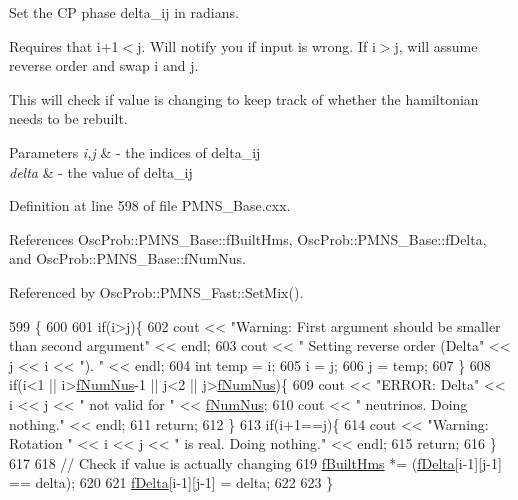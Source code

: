 Set the CP phase delta\+\_\+ij in radians.

Requires that i+1$<$j. Will notify you if input is wrong. If i$>$j, will assume reverse order and swap i and j.

This will check if value is changing to keep track of whether the hamiltonian needs to be rebuilt.


\begin{DoxyParams}{Parameters}
{\em i,j} & -\/ the indices of delta\+\_\+ij \\
\hline
{\em delta} & -\/ the value of delta\+\_\+ij \\
\hline
\end{DoxyParams}


Definition at line 598 of file P\+M\+N\+S\+\_\+\+Base.\+cxx.



References Osc\+Prob\+::\+P\+M\+N\+S\+\_\+\+Base\+::f\+Built\+Hms, Osc\+Prob\+::\+P\+M\+N\+S\+\_\+\+Base\+::f\+Delta, and Osc\+Prob\+::\+P\+M\+N\+S\+\_\+\+Base\+::f\+Num\+Nus.



Referenced by Osc\+Prob\+::\+P\+M\+N\+S\+\_\+\+Fast\+::\+Set\+Mix().


\begin{DoxyCode}
599 \{
600 
601   \textcolor{keywordflow}{if}(i>j)\{
602     cout << \textcolor{stringliteral}{"Warning: First argument should be smaller than second argument"} << endl;
603     cout << \textcolor{stringliteral}{"         Setting reverse order (Delta"} << j << i << \textcolor{stringliteral}{"). "} << endl;
604     \textcolor{keywordtype}{int} temp = i;
605     i = j;
606     j = temp;
607   \}
608   \textcolor{keywordflow}{if}(i<1 || i>\hyperlink{classOscProb_1_1PMNS__Base_a24bb74bed63569dfe88b18fa6a08060e}{fNumNus}-1 || j<2 || j>\hyperlink{classOscProb_1_1PMNS__Base_a24bb74bed63569dfe88b18fa6a08060e}{fNumNus})\{
609     cout << \textcolor{stringliteral}{"ERROR: Delta"} << i << j << \textcolor{stringliteral}{" not valid for "} << \hyperlink{classOscProb_1_1PMNS__Base_a24bb74bed63569dfe88b18fa6a08060e}{fNumNus};
610     cout << \textcolor{stringliteral}{" neutrinos. Doing nothing."} << endl;
611     \textcolor{keywordflow}{return};
612   \}
613   \textcolor{keywordflow}{if}(i+1==j)\{
614     cout << \textcolor{stringliteral}{"Warning: Rotation "} << i << j << \textcolor{stringliteral}{" is real. Doing nothing."} << endl;
615     \textcolor{keywordflow}{return};
616   \}
617 
618   \textcolor{comment}{// Check if value is actually changing}
619   \hyperlink{classOscProb_1_1PMNS__Base_a9ac3cadeac8db1b90f3152f476244780}{fBuiltHms} *= (\hyperlink{classOscProb_1_1PMNS__Base_ab2a5fa40e689b221c8a7d2c17213810d}{fDelta}[i-1][j-1] == delta);
620 
621   \hyperlink{classOscProb_1_1PMNS__Base_ab2a5fa40e689b221c8a7d2c17213810d}{fDelta}[i-1][j-1] = delta;
622 
623 \}
\end{DoxyCode}
\mbox{\label{classOscProb_1_1PMNS__Fast_a63733b246e6d2e609ce3de7a65ba5b9f}} 
